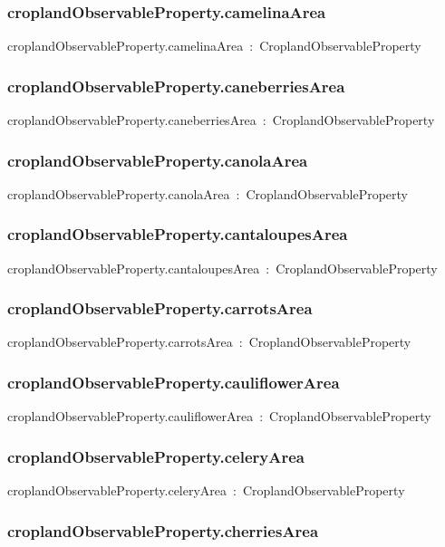 \documentclass{article}
\begin{document}
\subsubsection*{croplandObservableProperty.camelinaArea}

croplandObservableProperty.camelinaArea~:~CroplandObservableProperty

\subsubsection*{croplandObservableProperty.caneberriesArea}

croplandObservableProperty.caneberriesArea~:~CroplandObservableProperty

\subsubsection*{croplandObservableProperty.canolaArea}

croplandObservableProperty.canolaArea~:~CroplandObservableProperty

\subsubsection*{croplandObservableProperty.cantaloupesArea}

croplandObservableProperty.cantaloupesArea~:~CroplandObservableProperty

\subsubsection*{croplandObservableProperty.carrotsArea}

croplandObservableProperty.carrotsArea~:~CroplandObservableProperty

\subsubsection*{croplandObservableProperty.cauliflowerArea}

croplandObservableProperty.cauliflowerArea~:~CroplandObservableProperty

\subsubsection*{croplandObservableProperty.celeryArea}

croplandObservableProperty.celeryArea~:~CroplandObservableProperty

\subsubsection*{croplandObservableProperty.cherriesArea}
\end{document}
